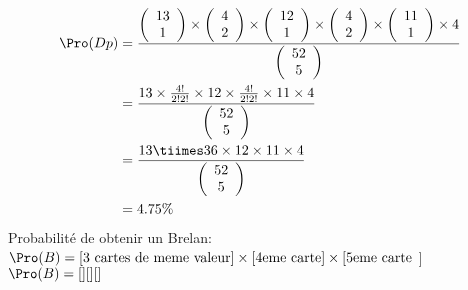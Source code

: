 \begin{align*}
    \Pro(Dp) &= \frac{{\left( \begin{array}{cc}13 \\ 1\end{array} \right)} \times {\left( \begin{array}{cc}4 \\ 2\end{array} \right)} \times {\left( \begin{array}{cc}12 \\ 1\end{array} \right)} \times {\left( \begin{array}{cc}4 \\ 2\end{array} \right)} \times {\left( \begin{array}{cc}11 \\ 1\end{array} \right)} \times 4}{{\left( \begin{array}{cc}52 \\ 5\end{array} \right)}}\\
    &= \frac{13 \times \frac{4!}{2!2!} \times 12 \times \frac{4!}{2!2!} \times 11 \times 4}{{\left( \begin{array}{cc}52 \\ 5\end{array} \right)}}\\
    &= \frac{13 \tiimes 36 \times 12 \times 11 \times 4}{{\left( \begin{array}{cc}52 \\ 5\end{array} \right)}} \\
    &=4.75\%
\end{align*}
Probabilité de obtenir un Brelan:\\
$\Pro(B) = [\text{3 cartes de meme valeur}] \times [ \text{4eme carte} ] \times  [\text{5eme carte}$ ]\\
$\Pro(B) = [][][]$
